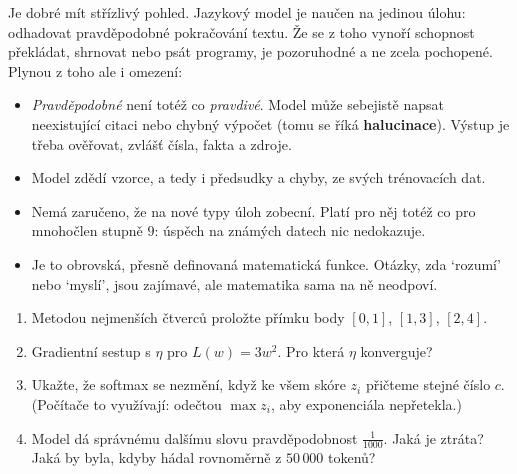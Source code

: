 Je dobré mít střízlivý pohled. Jazykový model je naučen na jedinou úlohu: odhadovat pravděpodobné pokračování textu. Že se z toho vynoří schopnost překládat, shrnovat nebo psát programy, je pozoruhodné a ne zcela pochopené. Plynou z toho ale i omezení:
\begin{itemize}
  \item \textit{Pravděpodobné} není totéž co \textit{pravdivé}. Model může sebejistě napsat neexistující citaci nebo chybný výpočet (tomu se říká \textbf{halucinace}). Výstup je třeba ověřovat, zvlášť čísla, fakta a zdroje.
  \item Model zdědí vzorce, a tedy i předsudky a chyby, ze svých trénovacích dat.
  \item Nemá zaručeno, že na nové typy úloh zobecní. Platí pro něj totéž co pro mnohočlen stupně $9$: úspěch na známých datech nic nedokazuje.
  \item Je to obrovská, přesně definovaná matematická funkce. Otázky, zda `rozumí' nebo `myslí', jsou zajímavé, ale matematika sama na ně neodpoví.
\end{itemize}

\begin{problem}
  \begin{enumerate}[label=(\alph*)]
    \item Metodou nejmenších čtverců proložte přímku body $[0, 1]$, $[1, 3]$, $[2, 4]$.
    \item Gradientní sestup s $\eta$ pro $L(w) = 3w^2$. Pro která $\eta$ konverguje?
    \item Ukažte, že softmax se nezmění, když ke všem skóre $z_i$ přičteme stejné číslo $c$. (Počítače to využívají: odečtou $\max z_i$, aby exponenciála nepřetekla.)
    \item Model dá správnému dalšímu slovu pravděpodobnost $\frac{1}{1000}$. Jaká je ztráta? Jaká by byla, kdyby hádal rovnoměrně z $50\,000$ tokenů?
  \end{enumerate}
\end{problem}

